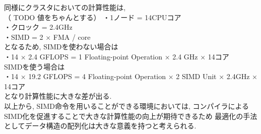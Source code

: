 同様にクラスタにおいての計算性能は,\\
（ TODO 値をちゃんとする）
・1ノード = 14CPUコア\\
・クロック = 2.4GHz\\
・SIMD = 2 × FMA / core\\
となるため, SIMDを使わない場合は\\
・14 × 2.4 GFLOPS = 1 Floating-point Operation × 2.4 GHz × 14コア\\
SIMDを使う場合は\\
・14 × 19.2 GFLOPS = 4 Floating-point Operation × 2 SIMD Unit × 2.4GHz × 14コア\\
となり計算性能に大きな差が出る.\\

以上から, SIMD命令を用いることができる環境においては, コンパイラによるSIMD化を促進することで大きな計算性能の向上が期待できるため
最適化の手法としてデータ構造の配列化は大きな意義を持つと考えられる.
